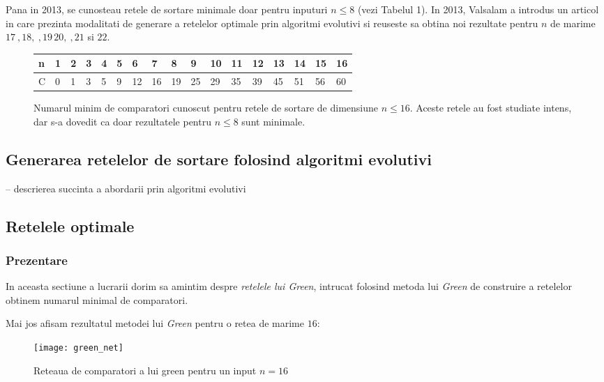 \documentclass[12pt]{article}
\begin{document}
Pana in 2013, se cunosteau retele de sortare minimale doar pentru inputuri $n \leq 8$ (vezi Tabelul 1). In 2013, Valsalam a introdus un articol in care prezinta modalitati de generare a retelelor optimale prin algoritmi evolutivi si reuseste sa obtina noi rezultate pentru $n$ de marime $17 \ , 18, \ , 19 \, 20, \ , 21$ si $22$.

\begin{figure}
\centering
\begin{tabu} to 1.1 \textwidth { | X[0] | X[1] | X[2] |  X[3] | X[4] | X[5] | X[6] | X[7] | X[8] | X[9] | X[10] | X[11] | X[12] | X[13] | X[14] | X[15] | X[16] |}
 \hline
 n & 1 & 2 & 3 & 4 & 5 & 6 & 7 & 8 & 9 & 10 & 11 & 12 & 13 & 14 & 15 & 16\\
 \hline
 C  & 0 & 1 & 3 & 5 & 9 & 12 & 16 & 19 & 25 & 29 & 35 & 39 & 45 & 51 & 56 & 60\\
\hline
\end{tabu}
\caption{Numarul minim de comparatori cunoscut pentru retele de sortare de dimensiune $n \leq 16$. Aceste retele au fost studiate intens, dar s-a dovedit ca doar rezultatele pentru $ n \leq 8$ sunt minimale.}

\end{figure}



\subsection{Generarea retelelor de sortare folosind algoritmi evolutivi}

-- descrierea succinta a abordarii prin algoritmi evolutivi

\subsection{Retelele optimale}

\subsubsection{Prezentare}
In aceasta sectiune a lucrarii dorim sa amintim despre \textit{retelele lui Green}, intrucat folosind metoda lui \textit{Green} de construire a retelelor obtinem numarul minimal de comparatori.

Mai jos afisam rezultatul metodei lui \textit{Green} pentru o retea de marime $16$:

\begin{figure}
\centering
\texttt{[image: green\_net]}
\\
\caption{Reteaua de comparatori a lui green pentru un input $n = 16$}
\end{figure}
\end{document}
